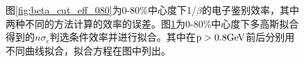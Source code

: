 \begin{figure}[htb]
\begin{subfigure}[b]{0.47\textwidth}
        \caption{}
        \label{fig:nSigmaE_cut_eff}
    \end{subfigure}
       \caption[电子鉴别判选条件效率示意图]{图\ref{fig:beta_cut_eff_080}为0-80\%中心度下1/$\beta$的电子鉴别效率，其中两种不同的方法计算的效率的误差。图\ref{fig:nSigmaE_cut_eff}为0-80\%中心度下多高斯拟合得到的$n\sigma_{e}$判选条件效率并进行拟合。其中在$\rm{p > 0.8 GeV}$前后分别用不同曲线拟合，拟合方程在图中列出。}
       \label{fig:TOFEff}
\end{figure}

